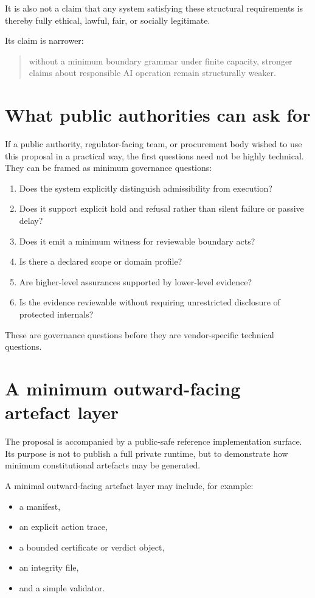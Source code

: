 \documentclass[11pt]{article}
\begin{document}
It is also not a claim that any system satisfying these structural requirements is thereby fully ethical, lawful, fair, or socially legitimate.

Its claim is narrower:

\begin{quote}
without a minimum boundary grammar under finite capacity, stronger claims about responsible AI operation remain structurally weaker.
\end{quote}

\section{What public authorities can ask for}

If a public authority, regulator-facing team, or procurement body wished to use this proposal in a practical way, the first questions need not be highly technical. They can be framed as minimum governance questions:

\begin{enumerate}[leftmargin=2em,label=\arabic*.]
    \item Does the system explicitly distinguish admissibility from execution?
    \item Does it support explicit hold and refusal rather than silent failure or passive delay?
    \item Does it emit a minimum witness for reviewable boundary acts?
    \item Is there a declared scope or domain profile?
    \item Are higher-level assurances supported by lower-level evidence?
    \item Is the evidence reviewable without requiring unrestricted disclosure of protected internals?
\end{enumerate}

These are governance questions before they are vendor-specific technical questions.

\section{A minimum outward-facing artefact layer}

The proposal is accompanied by a public-safe reference implementation surface. Its purpose is not to publish a full private runtime, but to demonstrate how minimum constitutional artefacts may be generated.

A minimal outward-facing artefact layer may include, for example:
\begin{itemize}[leftmargin=2em]
    \item a manifest,
    \item an explicit action trace,
    \item a bounded certificate or verdict object,
    \item an integrity file,
    \item and a simple validator.
\end{itemize}
\end{document}
